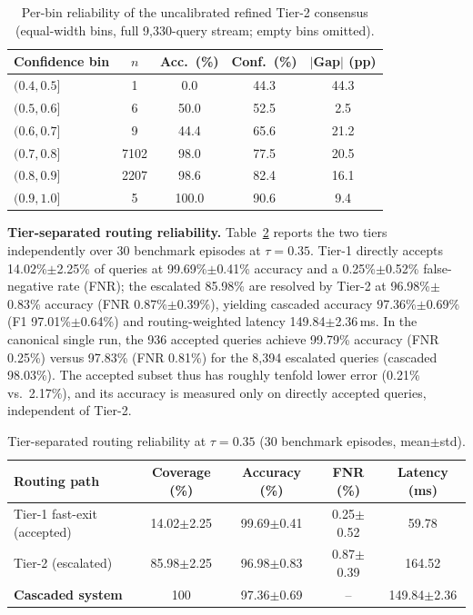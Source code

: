 \documentclass[preprint,12pt]{elsarticle}
\begin{document}
\begin{table}[htbp]
\centering
\caption{Per-bin reliability of the uncalibrated refined Tier-2 consensus (equal-width bins, full 9,330-query stream; empty bins omitted).}
\label{tab:reliability_bins}
\footnotesize
\begin{tabular}{lcccc}
\toprule
\textbf{Confidence bin} & \textbf{$n$} & \textbf{Acc.\ (\%)} & \textbf{Conf.\ (\%)} & \textbf{$|$Gap$|$ (pp)} \\
\midrule
$(0.4,0.5]$ & 1    & 0.0   & 44.3 & 44.3 \\
$(0.5,0.6]$ & 6    & 50.0  & 52.5 & 2.5 \\
$(0.6,0.7]$ & 9    & 44.4  & 65.6 & 21.2 \\
$(0.7,0.8]$ & 7102 & 98.0  & 77.5 & 20.5 \\
$(0.8,0.9]$ & 2207 & 98.6  & 82.4 & 16.1 \\
$(0.9,1.0]$ & 5    & 100.0 & 90.6 & 9.4 \\
\bottomrule
\end{tabular}
\end{table}

\textbf{Tier-separated routing reliability.} Table~\ref{tab:tier_routing} reports the two tiers independently over 30 benchmark episodes at $\tau=0.35$. Tier-1 directly accepts 14.02\%$\pm$2.25\% of queries at 99.69\%$\pm$0.41\% accuracy and a 0.25\%$\pm$0.52\% false-negative rate (FNR); the escalated 85.98\% are resolved by Tier-2 at 96.98\%$\pm$0.83\% accuracy (FNR 0.87\%$\pm$0.39\%), yielding cascaded accuracy 97.36\%$\pm$0.69\% (F1 97.01\%$\pm$0.64\%) and routing-weighted latency 149.84$\pm$2.36\,ms. In the canonical single run, the 936 accepted queries achieve 99.79\% accuracy (FNR 0.25\%) versus 97.83\% (FNR 0.81\%) for the 8,394 escalated queries (cascaded 98.03\%). The accepted subset thus has roughly tenfold lower error (0.21\% vs.\ 2.17\%), and its accuracy is measured only on directly accepted queries, independent of Tier-2.

\begin{table}[htbp]
\centering
\caption{Tier-separated routing reliability at $\tau=0.35$ (30 benchmark episodes, mean$\pm$std).}
\label{tab:tier_routing}
\footnotesize
\begin{tabularx}{\textwidth}{lcccc}
\toprule
\textbf{Routing path} & \textbf{Coverage (\%)} & \textbf{Accuracy (\%)} & \textbf{FNR (\%)} & \textbf{Latency (ms)} \\
\midrule
Tier-1 fast-exit (accepted) & 14.02$\pm$2.25 & 99.69$\pm$0.41 & 0.25$\pm$0.52 & 59.78 \\
Tier-2 (escalated) & 85.98$\pm$2.25 & 96.98$\pm$0.83 & 0.87$\pm$0.39 & 164.52 \\
\midrule
\textbf{Cascaded system} & 100 & 97.36$\pm$0.69 & -- & 149.84$\pm$2.36 \\
\bottomrule
\end{tabularx}
\end{table}
\end{document}
